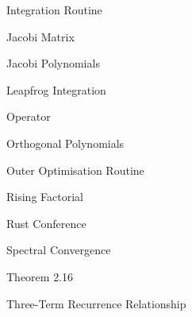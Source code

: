 \begin{definition}{Integration Routine}{}\end{definition}
\begin{definition}{Jacobi Matrix}{}\end{definition}
\begin{definition}{Jacobi Polynomials}{}\end{definition}
\begin{definition}{Leapfrog Integration}{}\end{definition}
\begin{definition}{Operator}{}\end{definition}
\begin{definition}{Orthogonal Polynomials}{}\end{definition}
\begin{definition}{Outer Optimisation Routine}{}\end{definition}
\begin{definition}{Rising Factorial}{}\end{definition}
\begin{definition}{Rust Conference}{}\end{definition}
\begin{definition}{Spectral Convergence}{}\end{definition}
\begin{definition}{Theorem 2.16}{}\end{definition}
\begin{definition}{Three-Term Recurrence Relationship}{}\end{definition}

